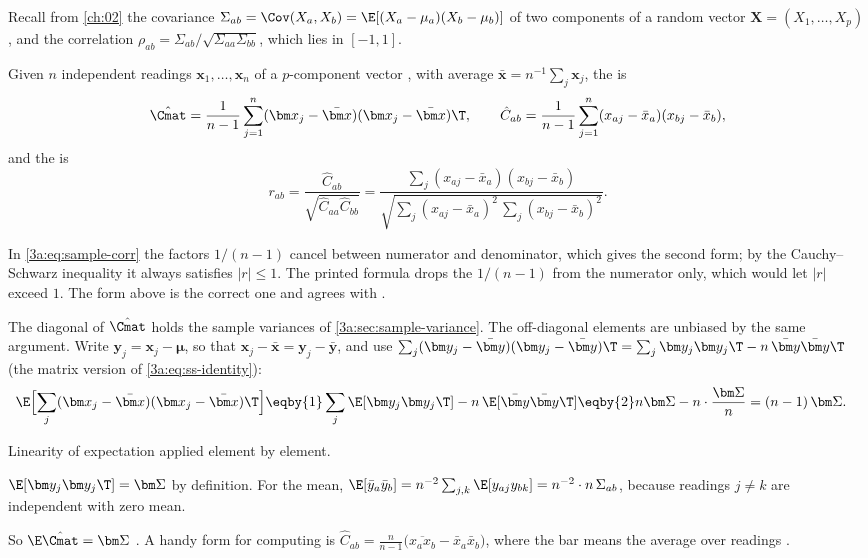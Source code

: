 Recall from \cref{ch:02} the covariance
$\Sigma_{ab}=\Cov(X_a,X_b)=\E[(X_a-\mu_a)(X_b-\mu_b)]$ of two components of
a random vector $\bm X=(X_1,\dots,X_p)$, and the correlation
$\rho_{ab}=\Sigma_{ab}/\sqrt{\Sigma_{aa}\Sigma_{bb}}$, which lies in $[-1,1]$.

\begin{workdef}
Given $n$ independent readings $\bm x_1,\dots,\bm x_n$ of a $p$-component
vector , with average $\bar{\bm x}=n^{-1}\sum_j\bm x_j$, the
 is
\begin{equation}
  \hat\Cmat=\frac{1}{n-1}\sum_{j=1}^n(\bm x_j-\bar{\bm x})(\bm x_j-\bar{\bm x})\T,
  \qquad
  \hat C_{ab}=\frac{1}{n-1}\sum_{j=1}^n(x_{aj}-\bar x_a)(x_{bj}-\bar x_b),
  \label{3a:eq:sample-cov}
\end{equation}
and the  is
\begin{equation}
  r_{ab}=\frac{\hat C_{ab}}{\sqrt{\hat C_{aa}\hat C_{bb}}}
  =\frac{\sum_j(x_{aj}-\bar x_a)(x_{bj}-\bar x_b)}
        {\sqrt{\sum_j(x_{aj}-\bar x_a)^2\,\sum_j(x_{bj}-\bar x_b)^2}} .
  \label{3a:eq:sample-corr}
\end{equation}
\end{workdef}

In \eqref{3a:eq:sample-corr} the factors $1/(n-1)$ cancel between numerator
and denominator, which gives the second form; by the Cauchy--Schwarz
inequality it always satisfies $|r|\le1$. The printed formula
 drops the $1/(n-1)$ from the numerator only, which would
let $|r|$ exceed $1$. The form above is the correct one and agrees with
.

The diagonal of $\hat\Cmat$ holds the sample variances of
\cref{3a:sec:sample-variance}. The off-diagonal elements are unbiased by the
same argument. Write $\bm y_j=\bm x_j-\bm\mu$, so that
$\bm x_j-\bar{\bm x}=\bm y_j-\bar{\bm y}$, and use
$\sum_j(\bm y_j-\bar{\bm y})(\bm y_j-\bar{\bm y})\T=\sum_j\bm y_j\bm y_j\T-n\,\bar{\bm y}\bar{\bm y}\T$
(the matrix version of \eqref{3a:eq:ss-identity}):
\begin{align}
  \E\Bigl[\sum_{j}(\bm x_j-\bar{\bm x})(\bm x_j-\bar{\bm x})\T\Bigr]
  &\eqby{1} \sum_j\E[\bm y_j\bm y_j\T]-n\,\E[\bar{\bm y}\bar{\bm y}\T]
   \eqby{2} n\bm\Sigma-n\cdot\frac{\bm\Sigma}{n}
   = (n-1)\,\bm\Sigma .
  \label{3a:eq:cov-unbiased}
\end{align}
\begin{explain}
  \item Linearity of expectation applied element by element.
  \item $\E[\bm y_j\bm y_j\T]=\bm\Sigma$ by definition. For the mean,
        $\E[\bar y_a\bar y_b]=n^{-2}\sum_{j,k}\E[y_{aj}y_{bk}]=n^{-2}\cdot n\,\Sigma_{ab}$,
        because readings $j\neq k$ are independent with zero mean.
\end{explain}
So $\E\hat\Cmat=\bm\Sigma$ . A handy form for
computing is $\hat C_{ab}=\frac{n}{n-1}\bigl(\overline{x_ax_b}-\bar x_a\bar x_b\bigr)$,
where the bar means the average over readings .

